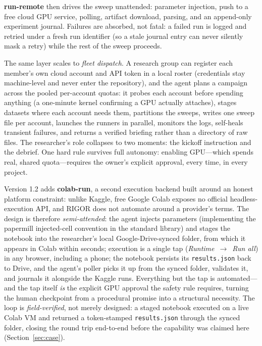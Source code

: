 \documentclass[11pt]{article}
\begin{document}
\textbf{run-remote} then drives the sweep unattended: parameter injection,
push to a free cloud GPU service, polling, artifact download, parsing, and an
append-only experiment journal. Failures are absorbed, not fatal: a failed
run is logged and retried under a fresh run identifier (so a stale journal
entry can never silently mask a retry) while the rest of the sweep proceeds.

The same layer scales to \emph{fleet dispatch}. A research group can register
each member's own cloud account and API token in a local roster (credentials
stay machine-level and never enter the repository), and the agent plans a
campaign across the pooled per-account quotas: it probes each account before
spending anything (a one-minute kernel confirming a GPU actually attaches),
stages datasets where each account needs them, partitions the sweeps, writes
one sweep file per account, launches the runners in parallel, monitors the
logs, self-heals transient failures, and returns a verified briefing rather
than a directory of raw files. The researcher's role collapses to two
moments: the kickoff instruction and the debrief. One hard rule survives
full autonomy: enabling GPU---which spends real, shared quota---requires the
owner's explicit approval, every time, in every project.

Version 1.2 adds \textbf{colab-run}, a second execution backend built around
an honest platform constraint: unlike Kaggle, free Google Colab exposes no
official headless-execution API, and RIGOR does not automate around a
provider's terms. The design is therefore \emph{semi-attended}: the agent
injects parameters (implementing the papermill injected-cell convention in
the standard library) and stages the notebook into the researcher's local
Google-Drive-synced folder, from which it appears in Colab within seconds;
execution is a single tap (\emph{Runtime}~$\to$~\emph{Run all}) in any
browser, including a phone; the notebook persists its \texttt{results.json}
back to Drive, and the agent's poller picks it up from the synced folder,
validates it, and journals it alongside the Kaggle runs. Everything but the
tap is automated---and the tap itself \emph{is} the explicit GPU approval
the safety rule requires, turning the human checkpoint from a procedural
promise into a structural necessity. The loop is \emph{field-verified}, not
merely designed: a staged notebook executed on a live Colab VM and returned
a token-stamped \texttt{results.json} through the synced folder, closing the
round trip end-to-end before the capability was claimed here
(Section~\ref{sec:case}).
\end{document}
